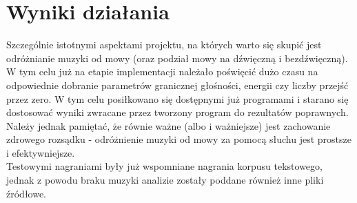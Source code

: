 \documentclass[a4paper]{article}
\begin{document}
\section{Wyniki działania}
Szczególnie istotnymi aspektami projektu, na których warto się skupić jest odróżnianie muzyki od mowy (oraz podział mowy na dźwięczną i bezdźwięczną).\\
W tym celu już na etapie implementacji należało poświęcić dużo czasu na odpowiednie dobranie parametrów granicznej głośności, energii czy liczby przejść przez zero. W tym celu posiłkowano się dostępnymi już programami i starano się dostosować wyniki zwracane przez tworzony program do rezultatów poprawnych. Należy jednak pamiętać, że równie ważne (albo i ważniejsze) jest zachowanie zdrowego rozsądku - odróżnienie muzyki od mowy za pomocą słuchu jest prostsze i efektywniejsze.\\
Testowymi nagraniami były już wspomniane nagrania korpusu tekstowego, jednak z powodu braku muzyki analizie zostały poddane również inne pliki źródłowe.
\end{document}
